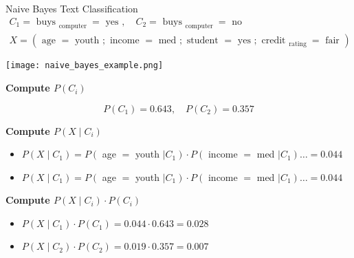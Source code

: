 \begin{example2}{Naive Bayes Text Classification}
    $$
    \begin{gathered}
    C_1=\text { buys }_{\text {computer }}=\text { yes }, \quad C_2=\text { buys }_{\text {computer }}=\text { no } \\
    X=\left(\text { age }=\text { youth } ; \text { income }=\text { med } ; \text { student }=\text { yes } ; \text { credit }_{\text {rating }}=\text { fair }\right)
    \end{gathered}
    $$

    \texttt{[image: naive\_bayes\_example.png]}

    \textbf{Compute $P\left(C_i\right)$}

$$
P\left(C_1\right)=0.643, \quad P\left(C_2\right)=0.357
$$


\textbf{Compute $P\left(X \mid C_i\right)$}
\begin{itemize}
    \item $P\left(X \mid C_1\right)=P\left(\right.$ age $=$ youth $\left.\mid C_1\right) \cdot P\left(\right.$ income $=$ med $\left.\mid C_1\right) \ldots=0.044$
    \item $P\left(X \mid C_1\right)=P\left(\right.$ age $=$ youth $\left.\mid C_1\right) \cdot P\left(\right.$ income $=$ med $\left.\mid C_1\right) \ldots=0.044$
\end{itemize}

\textbf{Compute $P\left(X \mid C_i\right) \cdot P\left(C_i\right)$}
\begin{itemize}
    \item $P\left(X \mid C_1\right) \cdot P\left(C_1\right)=0.044 \cdot 0.643=0.028$
    \item $P\left(X \mid C_2\right) \cdot P\left(C_2\right)=0.019 \cdot 0.357=0.007$
\end{itemize}
    
\end{example2}

